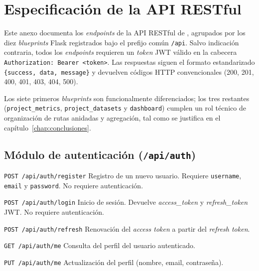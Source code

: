 \chapter{Especificación de la \acs{API} \acs{REST}ful}
\label{anx:api}

Este anexo documenta los \emph{endpoints} de la \ac{API} \ac{REST}ful de
\dataqual, agrupados por los diez \emph{blueprints} Flask registrados bajo el
prefijo común \texttt{/api}.  Salvo indicación contraria, todos los
\emph{endpoints} requieren un \emph{token} \ac{JWT} válido en la cabecera
\texttt{Authorization:~Bearer~<token>}.  Las respuestas siguen el formato
estandarizado \texttt{\{success,~data,~message\}} y devuelven códigos
\ac{HTTP} convencionales (200, 201, 400, 401, 403, 404, 500).

Los siete primeros \emph{blueprints} son funcionalmente diferenciados; los
tres restantes (\texttt{project\_metrics}, \texttt{project\_datasets} y
\texttt{dashboard}) cumplen un rol técnico de organización de rutas anidadas
y agregación, tal como se justifica en el capítulo~\ref{chap:conclusiones}.


\section{Módulo de autenticación (\texttt{/api/auth})}
\label{sec:api-auth}

\begin{definitionlist}
  \item[\texttt{POST /api/auth/register}]  Registro de un nuevo usuario.
    Requiere \texttt{username}, \texttt{email} y \texttt{password}.  No
    requiere autenticación.

  \item[\texttt{POST /api/auth/login}]  Inicio de sesión.  Devuelve
    \emph{access\_token} y \emph{refresh\_token} \ac{JWT}.  No requiere
    autenticación.

  \item[\texttt{POST /api/auth/refresh}]  Renovación del \emph{access token}
    a partir del \emph{refresh token}.

  \item[\texttt{GET /api/auth/me}]  Consulta del perfil del usuario
    autenticado.

  \item[\texttt{PUT /api/auth/me}]  Actualización del perfil
    (nombre, email, contraseña).
\end{definitionlist}


